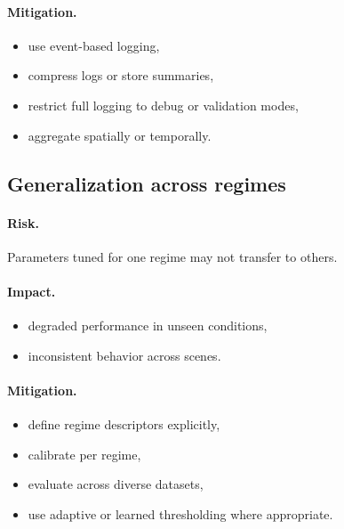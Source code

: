 \documentclass[11pt]{article}
\theoremstyle{definition}
\theoremstyle{plain}
\begin{document}
\paragraph{Mitigation.}
\begin{itemize}[leftmargin=1.5em]
    \item use event-based logging,
    \item compress logs or store summaries,
    \item restrict full logging to debug or validation modes,
    \item aggregate spatially or temporally.
\end{itemize}


\subsection{Generalization across regimes}

\paragraph{Risk.}
Parameters tuned for one regime may not transfer to others.

\paragraph{Impact.}
\begin{itemize}[leftmargin=1.5em]
    \item degraded performance in unseen conditions,
    \item inconsistent behavior across scenes.
\end{itemize}

\paragraph{Mitigation.}
\begin{itemize}[leftmargin=1.5em]
    \item define regime descriptors explicitly,
    \item calibrate per regime,
    \item evaluate across diverse datasets,
    \item use adaptive or learned thresholding where appropriate.
\end{itemize}

\end{document}
